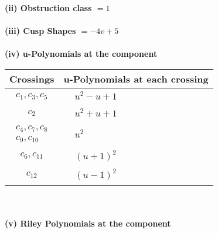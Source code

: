 \documentclass[1p]{elsarticle_modified}
\theoremstyle{definition}
\begin{document}
\flushleft \textbf{(ii) Obstruction class $= 1$}\\~\\
\flushleft \textbf{(iii) Cusp Shapes $= -4 v+5$}\\~\\
\newpage\renewcommand{\arraystretch}{1}
\flushleft \textbf{(iv) u-Polynomials at the component}\newline \\
\begin{tabular}{m{50pt}|m{274pt}}
Crossings & \hspace{64pt}u-Polynomials at each crossing \\
\hline $$\begin{aligned}c_{1},c_{3},c_{5}\end{aligned}$$&$\begin{aligned}
&u^2- u+1
\end{aligned}$\\
\hline $$\begin{aligned}c_{2}\end{aligned}$$&$\begin{aligned}
&u^2+u+1
\end{aligned}$\\
\hline $$\begin{aligned}c_{4},c_{7},c_{8}\\c_{9},c_{10}\end{aligned}$$&$\begin{aligned}
&u^2
\end{aligned}$\\
\hline $$\begin{aligned}c_{6},c_{11}\end{aligned}$$&$\begin{aligned}
&(u+1)^2
\end{aligned}$\\
\hline $$\begin{aligned}c_{12}\end{aligned}$$&$\begin{aligned}
&(u-1)^2
\end{aligned}$\\
\hline
\end{tabular}\\~\\
\newpage\renewcommand{\arraystretch}{1}
\flushleft \textbf{(v) Riley Polynomials at the component}\newline \\
\end{document}
